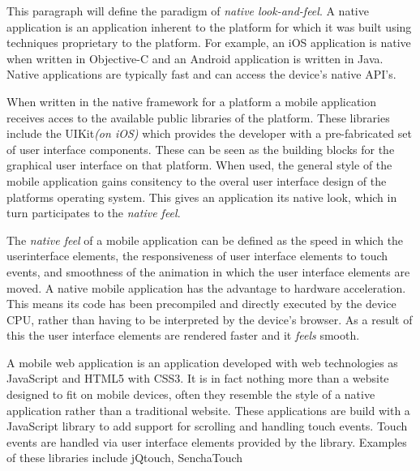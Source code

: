 



This paragraph will define the paradigm of \emph{native look-and-feel}. A native application is an application inherent to the platform for which it was built using techniques proprietary to the platform. For example, an iOS application is native when written in Objective-C and an Android application is written in Java.  Native applications are typically fast and can access the device's native API's.

When written in the native framework for a platform a mobile application receives acces to the available public libraries of the platform. These libraries include the UIKit\emph{(on iOS)} which provides the developer with a pre-fabricated set of user interface components. These can be seen as the building blocks for the graphical user interface on that platform. When used, the general style of the mobile application gains consitency to the overal user interface design of the platforms operating system. This gives an application its native look, which in turn participates to the \emph{native feel}.


The \emph{native feel} of a mobile application can be defined as the speed in which the userinterface elements, the responsiveness of user interface elements to touch events, and smoothness of the animation in which the user interface elements are moved. A native mobile application has the advantage to hardware acceleration. This means its code has been precompiled and directly executed by the device CPU, rather than having to be interpreted by the device's browser. As a result of this the user interface elements are rendered faster and it \emph{feels} smooth.


A mobile web application is an application developed with web technologies as JavaScript and HTML5 with CSS3. It is in fact nothing more than a website designed to fit on mobile devices, often they resemble the style of a native application rather than a traditional website. These applications are build with a JavaScript library to add support for scrolling and handling touch events. Touch events are handled via user interface elements provided by the library. Examples of these libraries include jQtouch, SenchaTouch

